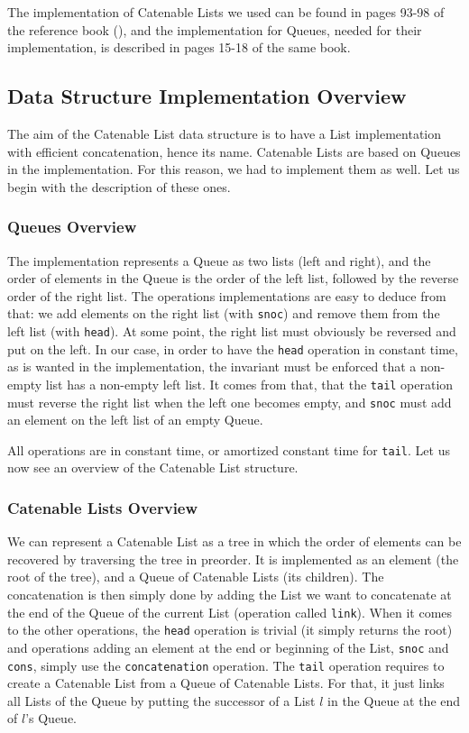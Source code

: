 The implementation of Catenable Lists we used can be found 
in pages 93-98 of the reference book (\cite{Okasaki}),
and the implementation for Queues, needed for their implementation, 
is described in pages 15-18 of the same book.

\subsection{Data Structure Implementation Overview}
The aim of the Catenable List data structure is 
to have a List implementation with efficient concatenation, 
hence its name.
Catenable Lists are based on Queues in the implementation.
For this reason, we had to implement them as well.
Let us begin with the description of these ones.

\subsubsection{Queues Overview}
The implementation represents a Queue as two lists (left and right), 
and the order of elements in the Queue is the order of the left list, 
followed by the reverse order of the right list.
The operations implementations are easy to deduce from that: 
we add elements on the right list (with \verb|snoc|) 
and remove them from the left list (with \verb|head|).
At some point, the right list must obviously be reversed and put on the left.
In our case, in order to have the \verb|head|
operation in constant time,
as is wanted in the implementation,
the invariant must be enforced that a non-empty list has a non-empty left list.
It comes from that, 
that the \verb|tail| operation must reverse the right list when the left one becomes empty, 
and \verb|snoc| must add an element on the left list of an empty Queue.

All operations are in constant time, or amortized constant time for \verb|tail|.
Let us now see an overview of the Catenable List structure.

\subsubsection{Catenable Lists Overview}
We can represent a Catenable List as a tree 
in which the order of elements can be recovered by traversing the tree in preorder.
It is implemented as an element (the root of the tree), 
and a Queue of Catenable Lists (its children).
The concatenation is then simply done by adding the List we want to concatenate 
at the end of the Queue of the current List 
(operation called \verb|link|).
When it comes to the other operations,
the \verb|head| operation is trivial (it simply returns the root)
and operations adding an element at the end or beginning of the List, 
\verb|snoc| and \verb|cons|,
simply use the \verb|concatenation| operation.
The \verb|tail| operation requires 
to create a Catenable List from a Queue of Catenable Lists.
For that, it just links all Lists of the Queue 
by putting the successor of a List $l$ in the Queue at the end of $l$'s Queue.

